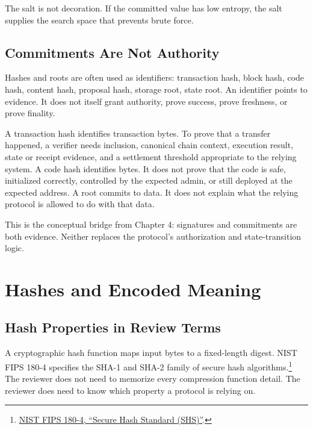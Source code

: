 The salt is not decoration. If the committed value has low entropy, the salt supplies the search space that prevents brute force.

\subsection{Commitments Are Not Authority}

Hashes and roots are often used as identifiers: transaction hash, block hash, code hash, content hash, proposal hash, storage root, state root. An identifier points to evidence. It does not itself grant authority, prove success, prove freshness, or prove finality.

A transaction hash identifies transaction bytes. To prove that a transfer happened, a verifier needs inclusion, canonical chain context, execution result, state or receipt evidence, and a settlement threshold appropriate to the relying system. A code hash identifies bytes. It does not prove that the code is safe, initialized correctly, controlled by the expected admin, or still deployed at the expected address. A root commits to data. It does not explain what the relying protocol is allowed to do with that data.

This is the conceptual bridge from Chapter 4: signatures and commitments are both evidence. Neither replaces the protocol's authorization and state-transition logic.

\section{Hashes and Encoded Meaning}

\subsection{Hash Properties in Review Terms}

A cryptographic hash function maps input bytes to a fixed-length digest. NIST FIPS 180-4 specifies the SHA-1 and SHA-2 family of secure hash algorithms.\footnote{\href{https://csrc.nist.gov/pubs/fips/180-4/upd1/final}{NIST FIPS 180-4, ``Secure Hash Standard (SHS)''}.} The reviewer does not need to memorize every compression function detail. The reviewer does need to know which property a protocol is relying on.

